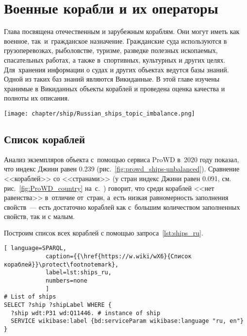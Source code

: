 \chapter{Военные корабли и их операторы}
\label{ch:ships-chapter}

Глава посвящена отечественным и зарубежным кораблям. 
Они могут иметь как военное, так~и~гражданское назначение. 
Гражданские суда используются в грузоперевозках, рыболовстве, туризме, 
разведке полезных ископаемых, спасательных работах, 
а также в~спортивных, культурных и других целях. 
Для~хранения информации о судах и других объектах ведутся базы знаний. 
Одной из таких баз знаний являются Викиданные. 
В этой главе изучены хранимые в Викиданных объекты кораблей и проведена оценка качества и полноты их описания.


\begin{marginfigure}[0.0cm]
  \texttt{[image: chapter/ship/Russian\_ships\_topic\_imbalance.png]}
  \caption{Индекс Джини~--- равномерность заполнения свойств <<кораблей>>, 2020 год}
  \label{fig:prowd_ships-unbalanced}%
\end{marginfigure}


\section{Список кораблей}

Анализ экземпляров объекта  
с~помощью сервиса ProWD в~2020 году показал, 
что индекс Джини равен 0.239 (рис.~\ref{fig:prowd_ships-unbalanced}). 
%
Сравнение <<кораблей>> со <<странами>> 
(у стран индекс Джини равен 0.091, см. рис.~\ref{fig:ProWD_country} 
                                  на~с.~\pageref{fig:ProWD_country}) 
говорит, что среди кораблей <<нет равенства>> в~отличие от~стран, 
а~есть низкая равномерность заполнения свойств~--- 
есть достаточно кораблей как с~большим количеством заполненных свойств, 
так и с малым.

Построим список всех кораблей с помощью запроса~\ref{lst:ships_ru}.


\begin{lstlisting}[ language=SPARQL, 
            caption={{\href{https://w.wiki/wX6}{Список кораблей}}\protect\footnotemark}, 
            label=lst:ships_ru, 
            numbers=none
            ]
# List of ships
SELECT ?ship ?shipLabel WHERE {
  ?ship wdt:P31 wd:Q11446. # instance of ship
  SERVICE wikibase:label {bd:serviceParam wikibase:language "ru, en"}
}
\end{lstlisting}


